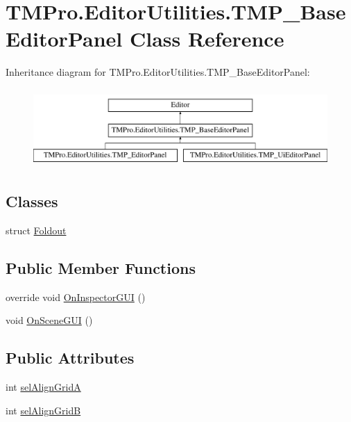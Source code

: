 \hypertarget{class_t_m_pro_1_1_editor_utilities_1_1_t_m_p___base_editor_panel}{}\section{T\+M\+Pro.\+Editor\+Utilities.\+T\+M\+P\+\_\+\+Base\+Editor\+Panel Class Reference}
\label{class_t_m_pro_1_1_editor_utilities_1_1_t_m_p___base_editor_panel}
Inheritance diagram for T\+M\+Pro.\+Editor\+Utilities.\+T\+M\+P\+\_\+\+Base\+Editor\+Panel\+:\begin{figure}[H]
\begin{center}
\leavevmode
\includegraphics[height=3.000000cm]{class_t_m_pro_1_1_editor_utilities_1_1_t_m_p___base_editor_panel}
\end{center}
\end{figure}
\subsection*{Classes}
\begin{DoxyCompactItemize}
\item 
struct \mbox{\hyperlink{struct_t_m_pro_1_1_editor_utilities_1_1_t_m_p___base_editor_panel_1_1_foldout}{Foldout}}
\end{DoxyCompactItemize}
\subsection*{Public Member Functions}
\begin{DoxyCompactItemize}
\item 
override void \mbox{\hyperlink{class_t_m_pro_1_1_editor_utilities_1_1_t_m_p___base_editor_panel_a7ff0cf356660eaff8f0280fb6b0aaffd}{On\+Inspector\+G\+UI}} ()
\item 
void \mbox{\hyperlink{class_t_m_pro_1_1_editor_utilities_1_1_t_m_p___base_editor_panel_a0f6360d66e05b77ee4d9dd46b00f4dad}{On\+Scene\+G\+UI}} ()
\end{DoxyCompactItemize}
\subsection*{Public Attributes}
\begin{DoxyCompactItemize}
\item 
int \mbox{\hyperlink{class_t_m_pro_1_1_editor_utilities_1_1_t_m_p___base_editor_panel_a7289d43625492e91e63d4508c85fd9e1}{sel\+Align\+GridA}}
\item 
int \mbox{\hyperlink{class_t_m_pro_1_1_editor_utilities_1_1_t_m_p___base_editor_panel_a4fca9e81bd8b99788677739aba2e17ce}{sel\+Align\+GridB}}
\end{DoxyCompactItemize}
